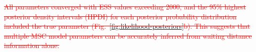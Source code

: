 \documentclass[11pt]{article}
\begin{document}

% 


\textcolor{red}{\sout{
All parameters converged with ESS values exceeding 2000, 
and the 95\% highest posterior density intervals (HPDI) for
each posterior probability distribution included the true 
parameter
(Fig.~\ref{fig:likelihood-posteriors}b).
This suggests that multiple MSC model parameters can be accurately 
inferred from waiting distance information alone. 
}}




\end{document}
